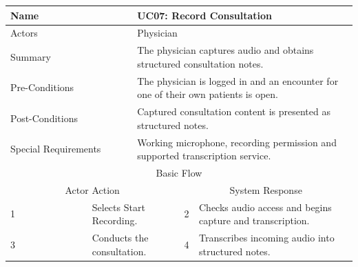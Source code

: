 \begin{reporttable}
\centering
\small
\caption{UC07: Record Consultation.}
\label{tab:kashaf:uc07}
\begin{tabular}{|p{}|p{}|p{}|p{}|p{}|}
\hline
\multicolumn{2}{|p{\dimexpr0.225\textwidth+2\tabcolsep+\arrayrulewidth\relax}|}{Name} & \multicolumn{3}{p{\dimexpr0.575\textwidth+4\tabcolsep+2\arrayrulewidth\relax}|}{UC07: Record Consultation} \\ \hline
\multicolumn{2}{|p{\dimexpr0.225\textwidth+2\tabcolsep+\arrayrulewidth\relax}|}{Actors} & \multicolumn{3}{p{\dimexpr0.575\textwidth+4\tabcolsep+2\arrayrulewidth\relax}|}{Physician} \\ \hline
\multicolumn{2}{|p{\dimexpr0.225\textwidth+2\tabcolsep+\arrayrulewidth\relax}|}{Summary} & \multicolumn{3}{p{\dimexpr0.575\textwidth+4\tabcolsep+2\arrayrulewidth\relax}|}{The physician captures audio and obtains structured consultation notes.} \\ \hline
\multicolumn{2}{|p{\dimexpr0.225\textwidth+2\tabcolsep+\arrayrulewidth\relax}|}{Pre-Conditions} & \multicolumn{3}{p{\dimexpr0.575\textwidth+4\tabcolsep+2\arrayrulewidth\relax}|}{The physician is logged in and an encounter for one of their own patients is open.} \\ \hline
\multicolumn{2}{|p{\dimexpr0.225\textwidth+2\tabcolsep+\arrayrulewidth\relax}|}{Post-Conditions} & \multicolumn{3}{p{\dimexpr0.575\textwidth+4\tabcolsep+2\arrayrulewidth\relax}|}{Captured consultation content is presented as structured notes.} \\ \hline
\multicolumn{2}{|p{\dimexpr0.225\textwidth+2\tabcolsep+\arrayrulewidth\relax}|}{Special Requirements} & \multicolumn{3}{p{\dimexpr0.575\textwidth+4\tabcolsep+2\arrayrulewidth\relax}|}{Working microphone, recording permission and supported transcription service.} \\ \hline
\multicolumn{5}{|c|}{Basic Flow} \\ \hline
\multicolumn{3}{|c|}{Actor Action} & \multicolumn{2}{c|}{System Response} \\ \hline
1 & \multicolumn{2}{p{\dimexpr0.37\textwidth+2\tabcolsep+\arrayrulewidth\relax}|}{Selects Start Recording.} & 2 & Checks audio access and begins capture and transcription. \\ \hline
3 & \multicolumn{2}{p{\dimexpr0.37\textwidth+2\tabcolsep+\arrayrulewidth\relax}|}{Conducts the consultation.} & 4 & Transcribes incoming audio into structured notes. \\ \hline

\end{tabular}
\end{reporttable}
